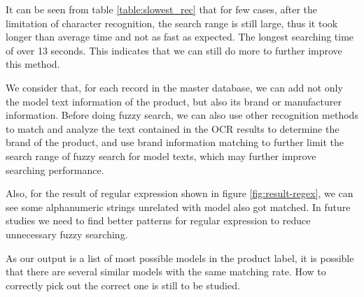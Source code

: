 \documentclass[technicalreport]{ieicej}
\begin{document}
    It can be seen from table \ref{table:slowest_rec} that for few cases, after the limitation of character recognition, the search range is still large, thus it took longer than average time and not as fast as expected. The longest searching time of over 13 seconds. This indicates that we can still do more to further improve this method.
    
    We consider that, for each record in the master database, we can add not only the model text information of the product, but also its brand or manufacturer information. Before doing fuzzy search, we can also use other recognition methods to match and analyze the text contained in the OCR results to determine the brand of the product, and use brand information matching to further limit the search range of fuzzy search for model texts, which may further improve searching performance.

    Also, for the result of regular expression shown in figure \ref{fig:result-regex}, we can see some alphanumeric strings unrelated with model also got matched. In future studies we need to find better patterns for regular expression to reduce unnecessary fuzzy searching.

    As our output is a list of most possible models in the product label, it is possible that there are several similar models with the same matching rate. How to correctly pick out the correct one is still to be studied.
    
\end{document}
